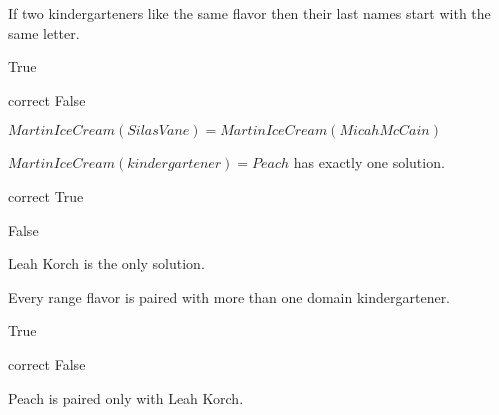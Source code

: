 \documentclass{ximera}
\begin{document}
\begin{question}
If two kindergarteners like the same flavor then their last names start with the same letter.
\begin{multipleChoice}
\item{True}
\item[correct]{False}
\end{multipleChoice}
\begin{feedback}
$MartinIceCream(Silas Vane) = MartinIceCream(Micah McCain)$
\end{feedback}
\end{question}


\begin{question}
$MartinIceCream(kindergartener) = Peach$ has exactly one solution.
\begin{multipleChoice}
\item[correct]{True}
\item{False}
\end{multipleChoice}
\begin{feedback}
Leah Korch is the only solution.
\end{feedback}
\end{question}


\begin{question}
Every range flavor is paired with more than one domain kindergartener.
\begin{multipleChoice}
\item{True}
\item[correct]{False}
\end{multipleChoice}
\begin{feedback}
Peach is paired only with Leah Korch.
\end{feedback}
\end{question}
\end{document}
